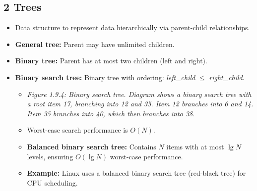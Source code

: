\documentclass{article}
\begin{document}
\subsection*{2 Trees}
\begin{itemize}
    \item Data structure to represent data hierarchically via parent-child relationships.
    \item \textbf{General tree:} Parent may have unlimited children.
    \item \textbf{Binary tree:} Parent has at most two children (left and right).
    \item \textbf{Binary search tree:} Binary tree with ordering: \textit{left\_child} $\le$ \textit{right\_child}.
    \begin{itemize}
        \item \textit{Figure 1.9.4: Binary search tree. Diagram shows a binary search tree with a root item 17, branching into 12 and 35. Item 12 branches into 6 and 14. Item 35 branches into 40, which then branches into 38.}
        \item Worst-case search performance is $O(N)$.
        \item \textbf{Balanced binary search tree:} Contains $N$ items with at most $\lg N$ levels, ensuring $O(\lg N)$ worst-case performance.
        \item \textbf{Example:} Linux uses a balanced binary search tree (red-black tree) for CPU scheduling.
    \end{itemize}
\end{itemize}
\end{document}
